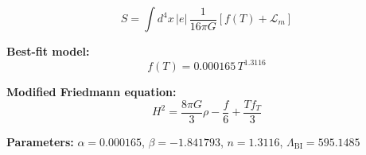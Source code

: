 
\begin{equation}
  S = \int d^4x \, |e| \, \frac{1}{16\pi G} \left[ f(T) + \mathcal{L}_m \right]
\end{equation}

\textbf{Best-fit model:}
\begin{equation}
  f(T) = 0.000165 \, T^{1.3116}
\end{equation}

\textbf{Modified Friedmann equation:}
\begin{equation}
  H^2 = \frac{8\pi G}{3} \rho - \frac{f}{6} + \frac{T f_T}{3}
\end{equation}

\textbf{Parameters:}
$\alpha = 0.000165$, \quad
$\beta = -1.841793$, \quad
$n = 1.3116$, \quad
$\Lambda_{\text{BI}} = 595.1485$